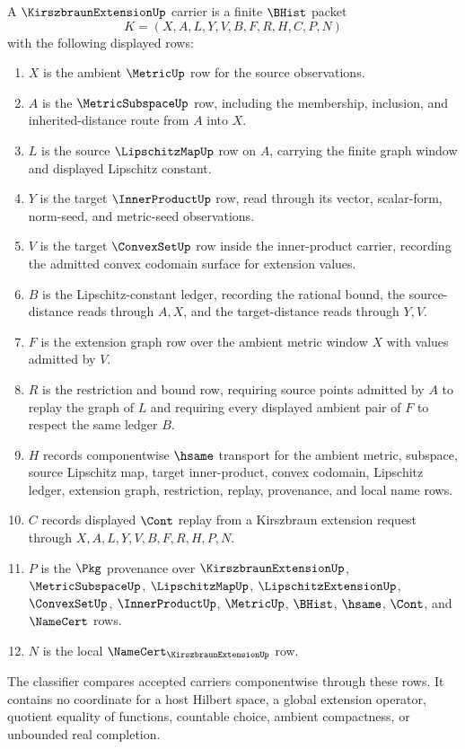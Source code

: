 \begin{definition}
\label{def:kirszbraun-extension-carrier}
A $\KirszbraunExtensionUp$ carrier is a finite $\BHist$ packet
$$
K=(X,A,L,Y,V,B,F,R,H,C,P,N)
$$
with the following displayed rows:
\begin{enumerate}
\item $X$ is the ambient $\MetricUp$ row for the source observations.
\item $A$ is the $\MetricSubspaceUp$ row, including the membership, inclusion, and inherited-distance route from $A$ into $X$.
\item $L$ is the source $\LipschitzMapUp$ row on $A$, carrying the finite graph window and displayed Lipschitz constant.
\item $Y$ is the target $\InnerProductUp$ row, read through its vector, scalar-form, norm-seed, and metric-seed observations.
\item $V$ is the target $\ConvexSetUp$ row inside the inner-product carrier, recording the admitted convex codomain surface for extension values.
\item $B$ is the Lipschitz-constant ledger, recording the rational bound, the source-distance reads through $A,X$, and the target-distance reads through $Y,V$.
\item $F$ is the extension graph row over the ambient metric window $X$ with values admitted by $V$.
\item $R$ is the restriction and bound row, requiring source points admitted by $A$ to replay the graph of $L$ and requiring every displayed ambient pair of $F$ to respect the same ledger $B$.
\item $H$ records componentwise $\hsame$ transport for the ambient metric, subspace, source Lipschitz map, target inner-product, convex codomain, Lipschitz ledger, extension graph, restriction, replay, provenance, and local name rows.
\item $C$ records displayed $\Cont$ replay from a Kirszbraun extension request through $X,A,L,Y,V,B,F,R,H,P,N$.
\item $P$ is the $\Pkg$ provenance over $\KirszbraunExtensionUp$, $\MetricSubspaceUp$, $\LipschitzMapUp$, $\LipschitzExtensionUp$, $\ConvexSetUp$, $\InnerProductUp$, $\MetricUp$, $\BHist$, $\hsame$, $\Cont$, and $\NameCert$ rows.
\item $N$ is the local $\NameCert_{\KirszbraunExtensionUp}$ row.
\end{enumerate}
The classifier compares accepted carriers componentwise through these rows. It contains no coordinate for a host Hilbert space, a global extension operator, quotient equality of functions, countable choice, ambient compactness, or unbounded real completion.
\end{definition}

